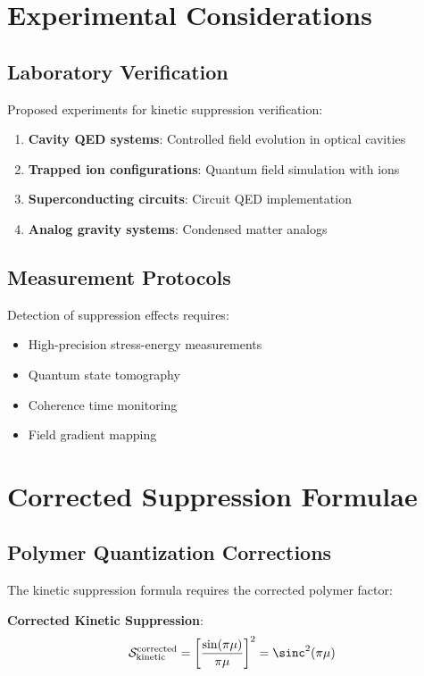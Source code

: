 \documentclass[12pt,a4paper]{article}
\begin{document}
\section{Experimental Considerations}

\subsection{Laboratory Verification}

Proposed experiments for kinetic suppression verification:

\begin{enumerate}
\item \textbf{Cavity QED systems}: Controlled field evolution in optical cavities
\item \textbf{Trapped ion configurations}: Quantum field simulation with ions
\item \textbf{Superconducting circuits}: Circuit QED implementation
\item \textbf{Analog gravity systems}: Condensed matter analogs
\end{enumerate}

\subsection{Measurement Protocols}

Detection of suppression effects requires:

\begin{itemize}
\item High-precision stress-energy measurements
\item Quantum state tomography
\item Coherence time monitoring
\item Field gradient mapping
\end{itemize}

\section{Corrected Suppression Formulae}

\subsection{Polymer Quantization Corrections}

The kinetic suppression formula requires the corrected polymer factor:

\textbf{Corrected Kinetic Suppression}:
\begin{equation}
\mathcal{S}_{\text{kinetic}}^{\text{corrected}} = \left[\frac{\sin(\pi\mu)}{\pi\mu}\right]^2 = \sinc^2(\pi\mu)
\end{equation}
\end{document}
